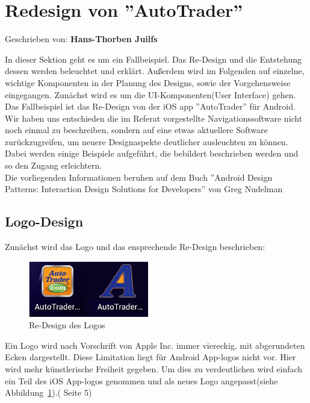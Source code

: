 
\section{Redesign von ''AutoTrader''}

Geschrieben von: \textbf{Hans-Thorben Juilfs}
\newline

In dieser Sektion geht es um ein Fallbeispiel. Das Re-Design und die Entstehung dessen werden beleuchtet und erklärt. Außerdem wird im Folgenden auf einzelne, wichtige Komponenten in der Planung des Designs, sowie der Vorgehensweise eingegangen. Zunächst wird es um die UI-Komponenten(User Interface) gehen.\\

Das Fallbeispiel ist das Re-Design von der iOS app ''AutoTrader'' für Android. Wir haben uns entschieden die im Referat vorgestellte Navigationssoftware nicht noch einmal zu beschreiben, sondern auf eine etwas aktuellere Software zurückzugreifen, um neuere Designaspekte deutlicher ausleuchten zu können.\\

Dabei werden einige Beispiele aufgeführt, die bebildert beschrieben werden und so den Zugang erleichtern.\\

Die vorliegenden Informationen beruhen auf dem Buch ''Android Design Patterns: Interaction Design Solutions for Developers'' von Greg Nudelman\\


\subsection{Logo-Design}
\label{sub:logodesign}
Zunächst wird das Logo und das ensprechende Re-Design beschrieben:\\

\begin{figure}[h]
 \centering
 \includegraphics[height=0.10\textheight]{img/logo.png}
 \caption{Re-Design des Logos}
 \label{fig:logo}
\end{figure}

Ein Logo wird nach Vorschrift von Apple Inc. immer viereckig, mit abgerundeten Ecken dargestellt. Diese Limitation liegt für Android App-logos nicht vor. Hier wird mehr künstlerische Freiheit gegeben. Um dies zu verdeutlichen wird einfach ein Teil des iOS App-logos genommen und als neues Logo angepasst(siehe Abbildung~\ref{fig:logo}).(\cite{AndroidDesignPatterns} Seite 5)

